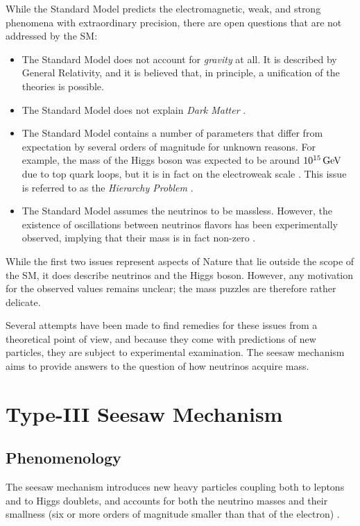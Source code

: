 While the Standard Model predicts the electromagnetic, weak, and strong phenomena with extraordinary precision, there are open questions that are not addressed by the SM:
\begin{itemize}
	\item The Standard Model does not account for \textit{gravity} at all. It is described by General Relativity, and it is believed that, in principle, a unification of the theories is possible.
	\item The Standard Model does not explain \textit{Dark Matter} \cite{Pomarol:2012sb}.
	\item The Standard Model contains a number of parameters that differ from expectation by several orders of magnitude for unknown reasons. For example, the mass of the Higgs boson was expected to be around $10^{15}\,\text{Ge\hspace{-.08em}V}$ due to top quark loops, but it is in fact on the electroweak scale \cite{Aad:2015zhl}. This issue is referred to as the \textit{Hierarchy Problem} \cite{Martin:1997ns}.
	\item The Standard Model assumes the neutrinos to be massless. However, the existence of oscillations between neutrinos flavors has been experimentally observed, implying that their mass is in fact non-zero \cite{PhysRevD.22.2227,Fukuda:1998fd,Nustatus}.
\end{itemize}

While the first two issues represent aspects of Nature that lie outside the scope of the SM, it does describe neutrinos and the Higgs boson. However, any motivation for the observed values remains unclear; the mass puzzles are therefore rather delicate.

Several attempts have been made to find remedies for these issues from a theoretical point of view, and because they come with predictions of new particles, they are subject to experimental examination. The seesaw mechanism aims to provide answers to the question of how neutrinos acquire mass. 

\section{Type-III Seesaw Mechanism}
\subsection{Phenomenology}
\label{sec:Theory/SeesawPhenomenology}

The seesaw mechanism introduces new heavy particles coupling both to leptons and to Higgs doublets, and accounts for both the neutrino masses and their smallness (six or more orders of magnitude smaller than that of the electron) \cite{SeesawI,typeIa,typeIb,typeIe,typeIIa,typeIIb,typeIIc,typeIId,typeIIe,SeesawIII:a,Seesawinverse}.

